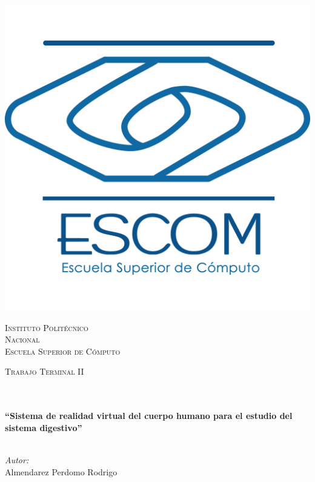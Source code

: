 \documentclass[11pt]{report}
\begin{document}
\begin{center}
\begin{minipage}{0.48\textwidth}
\begin{flushright}
\includegraphics[scale = 0.08]{images/escom.png}
\end{flushright}\end{minipage}
\vspace*{1.5cm}
\textsc{\huge Instituto Polit\'ecnico\\ \vspace{5px} Nacional}\\[1.5cm]
\textsc{\LARGE Escuela Superior de C\'omputo}\\[1.5cm]
\begin{minipage}{0.9\textwidth} 
\begin{center}
\textsc{\LARGE Trabajo Terminal II}
\end{center}
\end{minipage}\\[0.5cm]
\vspace*{1cm}
\HRule \\[0.4cm]
{ \huge \bfseries “Sistema de realidad virtual del cuerpo humano para el estudio del sistema digestivo”
}\\[0.4cm]
\HRule \\[1.5cm]
\begin{minipage}{0.46\textwidth}
\begin{flushleft} \large
\emph{Autor:}\\	
Almendarez Perdomo Rodrigo\\

\end{flushleft}
\end{minipage}
\end{center}
\end{document}
